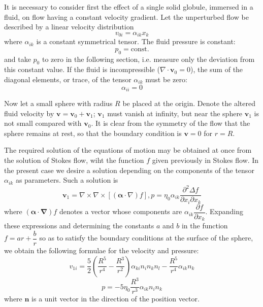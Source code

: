 \documentclass[conference]{IEEEtran}
\theoremstyle{definition}
\theoremstyle{remark}
\begin{document}
    It is necessary to consider first the effect of a single solid globule, immersed in a fluid, on flow having a constant velocity gradient. Let the unperturbed flow be described by a linear velocity distribution
    \begin{equation}
        v_{0i} = \alpha_{ik} x_k
        \label{eq:linear_velocity}
    \end{equation}
    where $\alpha_{ik}$ is a constant symmetrical tensor. The fluid pressure is constant:
    \begin{equation*}
        p_0 = \text{const}.
    \end{equation*}
    and take $p_0$ to zero in the following section, i.e. measure only the deviation from this constant value. If the fluid is incompressible ($\nabla \cdot \mathbf{v}_0 = 0$), the sum of the diagonal elements, or trace, of the tensor $\alpha_{ik}$ must be zero:
    \begin{equation}
        \alpha_{ii} = 0
    \end{equation}

    Now let a small sphere with radius $R$ be placed at the origin. Denote the altered fluid velocity by $\mathbf{v} = \mathbf{v}_0 + \mathbf{v}_1$; $\mathbf{v}_1$ must vanish at infinity, but near the sphere $\mathbf{v}_1$ is not small compared with $\mathbf{v}_0$. It is clear from the symmetry of the flow that the sphere remains at rest, so that the boundary condition is $\mathbf{v} = 0$ for $r = R$.

    The required solution of the equations of motion may be obtained at once from the solution of Stokes flow, wiht the function $f$ given previously in Stokes flow. In the present case we desire a solution depending on the components of the tensor $\alpha_{ik}$ as parameters. Such a solution is
    \begin{equation*}
        \mathbf{v}_1 = \nabla \times \nabla \times [(\boldsymbol{\alpha} \cdot \nabla) f], p = \eta_0 \alpha_{ik} \dfrac{\partial^2 \Delta f}{\partial x_i\partial x_k}
    \end{equation*}
    where $(\boldsymbol{\alpha \cdot \nabla}) f$ denotes a vector whose components are $\alpha_{ik} \dfrac{\partial f}{\partial x_k}$. Expanding these expressions and determining the constants $a$ and $b$ in the function $f = ar + \dfrac{b}{r}$ so as to satisfy the boundary conditions at the surface of the sphere, we obtain the following formulae for the velocity and pressure:
    \begin{equation}
        v_{1i} = \dfrac{5}{2} \left( \dfrac{R^5}{r^4} - \dfrac{R^3}{r^2} \right) \alpha_{ki} n_i n_k n_l - \dfrac{R^5}{r^4} \alpha_{ik} n_k
        \label{eq:suspension_velocity}
    \end{equation}
    \begin{equation}
        p = -5 \eta_0 \dfrac{R^3}{r^3} \alpha_{ik} n_i n_k
    \end{equation}
    where $\mathbf{n}$ is a unit vector in the direction of the position vector.
\end{document}
